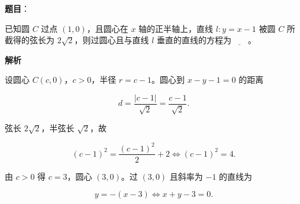 \begin{answer}

\textbf{题目}：

已知圆 $C$ 过点 $(1,0)$，且圆心在 $x$ 轴的正半轴上，直线 $l:y=x-1$ 被圆 $C$ 所截得的弦长为 $2\sqrt2$，则过圆心且与直线 $l$ 垂直的直线的方程为$\underline{\qquad}$。

\textbf{解析}

设圆心 $C(c,0)$，$c>0$，半径 $r=c-1$。圆心到 $x-y-1=0$ 的距离

\nopagebreak[4]
\[d=\frac{|c-1|}{\sqrt2}=\frac{c-1}{\sqrt2}.\]

弦长 $2\sqrt2$，半弦长 $\sqrt2$，故

\nopagebreak[4]
\[(c-1)^2=\frac{(c-1)^2}{2}+2\iff (c-1)^2=4.\]

由 $c>0$ 得 $c=3$，圆心 $(3,0)$。过 $(3,0)$ 且斜率为 $-1$ 的直线为

\nopagebreak[4]
\[y=-(x-3)\iff x+y-3=0.\]


\end{answer}
